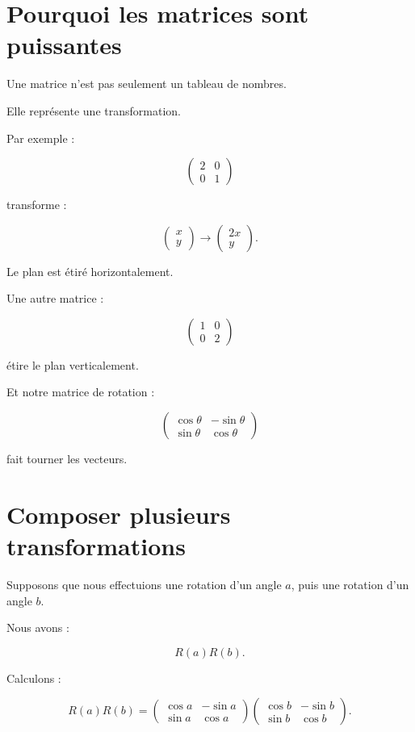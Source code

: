 \documentclass[11pt,a4paper]{article}
\newcommand{\sectiontitle}[1]{
    \section{#1}
}
\begin{document}

\sectiontitle{Pourquoi les matrices sont puissantes}

Une matrice n'est pas seulement un tableau de nombres.

Elle représente une transformation.

Par exemple :

\[
\begin{pmatrix}
2&0\\
0&1
\end{pmatrix}
\]

transforme :

\[
\begin{pmatrix}
x\\
y
\end{pmatrix}
\longrightarrow
\begin{pmatrix}
2x\\
y
\end{pmatrix}.
\]

Le plan est étiré horizontalement.

Une autre matrice :

\[
\begin{pmatrix}
1&0\\
0&2
\end{pmatrix}
\]

étire le plan verticalement.

Et notre matrice de rotation :

\[
\begin{pmatrix}
\cos\theta&-\sin\theta\\
\sin\theta&\cos\theta
\end{pmatrix}
\]

fait tourner les vecteurs.


\sectiontitle{Composer plusieurs transformations}

Supposons que nous effectuions une rotation d'un angle $a$,
puis une rotation d'un angle $b$.

Nous avons :

\[
R(a)R(b).
\]

Calculons :

\[
R(a)R(b)
=
\begin{pmatrix}
\cos a&-\sin a\\
\sin a&\cos a
\end{pmatrix}
\begin{pmatrix}
\cos b&-\sin b\\
\sin b&\cos b
\end{pmatrix}.
\]
\end{document}
